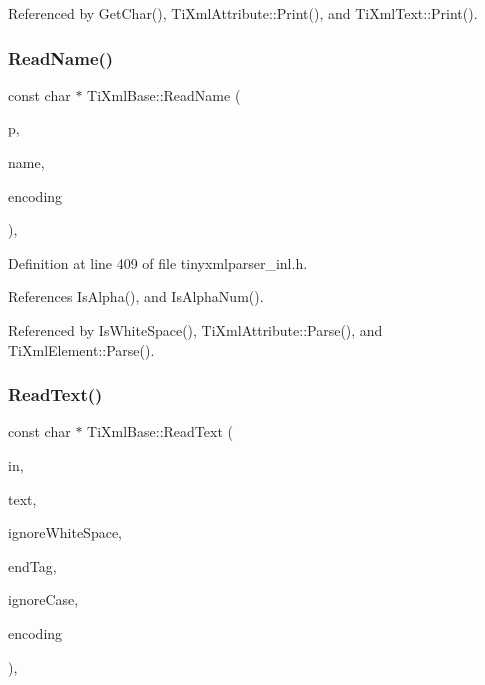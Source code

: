 Referenced by Get\+Char(), Ti\+Xml\+Attribute\+::\+Print(), and Ti\+Xml\+Text\+::\+Print().

\hypertarget{class_ti_xml_base_a1c21a6ab5f7b503acd91f35f183734b3}{}\label{class_ti_xml_base_a1c21a6ab5f7b503acd91f35f183734b3} 
\subsubsection{\texorpdfstring{Read\+Name()}{ReadName()}}
{\footnotesize\ttfamily const char $\ast$ Ti\+Xml\+Base\+::\+Read\+Name (\begin{DoxyParamCaption}\item[{const char $\ast$}]{p,  }\item[{\hyperlink{tinyxml_8h_a92bada05fd84d9a0c9a5bbe53de26887}{T\+I\+X\+M\+L\+\_\+\+S\+T\+R\+I\+NG} $\ast$}]{name,  }\item[{\hyperlink{tinyxml_8h_a88d51847a13ee0f4b4d320d03d2c4d96}{Ti\+Xml\+Encoding}}]{encoding }\end{DoxyParamCaption})\hspace{0.3cm}{\ttfamily [static]}, {\ttfamily [protected]}}



Definition at line 409 of file tinyxmlparser\+\_\+inl.\+h.



References Is\+Alpha(), and Is\+Alpha\+Num().



Referenced by Is\+White\+Space(), Ti\+Xml\+Attribute\+::\+Parse(), and Ti\+Xml\+Element\+::\+Parse().

\hypertarget{class_ti_xml_base_aa646c74921aa33156968b802bbf5566e}{}\label{class_ti_xml_base_aa646c74921aa33156968b802bbf5566e} 
\subsubsection{\texorpdfstring{Read\+Text()}{ReadText()}}
{\footnotesize\ttfamily const char $\ast$ Ti\+Xml\+Base\+::\+Read\+Text (\begin{DoxyParamCaption}\item[{const char $\ast$}]{in,  }\item[{\hyperlink{tinyxml_8h_a92bada05fd84d9a0c9a5bbe53de26887}{T\+I\+X\+M\+L\+\_\+\+S\+T\+R\+I\+NG} $\ast$}]{text,  }\item[{bool}]{ignore\+White\+Space,  }\item[{const char $\ast$}]{end\+Tag,  }\item[{bool}]{ignore\+Case,  }\item[{\hyperlink{tinyxml_8h_a88d51847a13ee0f4b4d320d03d2c4d96}{Ti\+Xml\+Encoding}}]{encoding }\end{DoxyParamCaption})\hspace{0.3cm}{\ttfamily [static]}, {\ttfamily [protected]}}



